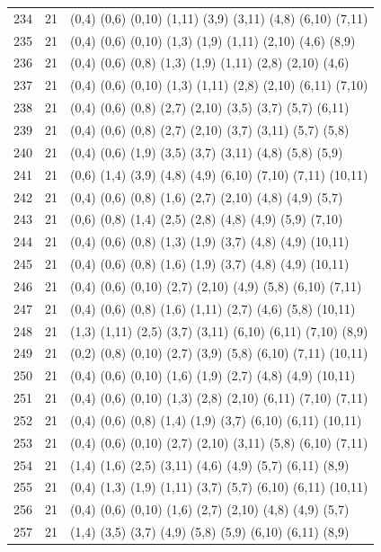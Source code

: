{\begin{longtable}{lll}
234 & 21 & (0,4) (0,6) (0,10) (1,11) (3,9) (3,11) (4,8) (6,10) (7,11) \\
235 & 21 & (0,4) (0,6) (0,10) (1,3) (1,9) (1,11) (2,10) (4,6) (8,9) \\
236 & 21 & (0,4) (0,6) (0,8) (1,3) (1,9) (1,11) (2,8) (2,10) (4,6) \\
237 & 21 & (0,4) (0,6) (0,10) (1,3) (1,11) (2,8) (2,10) (6,11) (7,10) \\
238 & 21 & (0,4) (0,6) (0,8) (2,7) (2,10) (3,5) (3,7) (5,7) (6,11) \\
239 & 21 & (0,4) (0,6) (0,8) (2,7) (2,10) (3,7) (3,11) (5,7) (5,8) \\
240 & 21 & (0,4) (0,6) (1,9) (3,5) (3,7) (3,11) (4,8) (5,8) (5,9) \\
241 & 21 & (0,6) (1,4) (3,9) (4,8) (4,9) (6,10) (7,10) (7,11) (10,11) \\
242 & 21 & (0,4) (0,6) (0,8) (1,6) (2,7) (2,10) (4,8) (4,9) (5,7) \\
243 & 21 & (0,6) (0,8) (1,4) (2,5) (2,8) (4,8) (4,9) (5,9) (7,10) \\
244 & 21 & (0,4) (0,6) (0,8) (1,3) (1,9) (3,7) (4,8) (4,9) (10,11) \\
245 & 21 & (0,4) (0,6) (0,8) (1,6) (1,9) (3,7) (4,8) (4,9) (10,11) \\
246 & 21 & (0,4) (0,6) (0,10) (2,7) (2,10) (4,9) (5,8) (6,10) (7,11) \\
247 & 21 & (0,4) (0,6) (0,8) (1,6) (1,11) (2,7) (4,6) (5,8) (10,11) \\
248 & 21 & (1,3) (1,11) (2,5) (3,7) (3,11) (6,10) (6,11) (7,10) (8,9) \\
249 & 21 & (0,2) (0,8) (0,10) (2,7) (3,9) (5,8) (6,10) (7,11) (10,11) \\
250 & 21 & (0,4) (0,6) (0,10) (1,6) (1,9) (2,7) (4,8) (4,9) (10,11) \\
251 & 21 & (0,4) (0,6) (0,10) (1,3) (2,8) (2,10) (6,11) (7,10) (7,11) \\
252 & 21 & (0,4) (0,6) (0,8) (1,4) (1,9) (3,7) (6,10) (6,11) (10,11) \\
253 & 21 & (0,4) (0,6) (0,10) (2,7) (2,10) (3,11) (5,8) (6,10) (7,11) \\
254 & 21 & (1,4) (1,6) (2,5) (3,11) (4,6) (4,9) (5,7) (6,11) (8,9) \\
255 & 21 & (0,4) (1,3) (1,9) (1,11) (3,7) (5,7) (6,10) (6,11) (10,11) \\
256 & 21 & (0,4) (0,6) (0,10) (1,6) (2,7) (2,10) (4,8) (4,9) (5,7) \\
257 & 21 & (1,4) (3,5) (3,7) (4,9) (5,8) (5,9) (6,10) (6,11) (8,9) \\

\end{longtable}}
